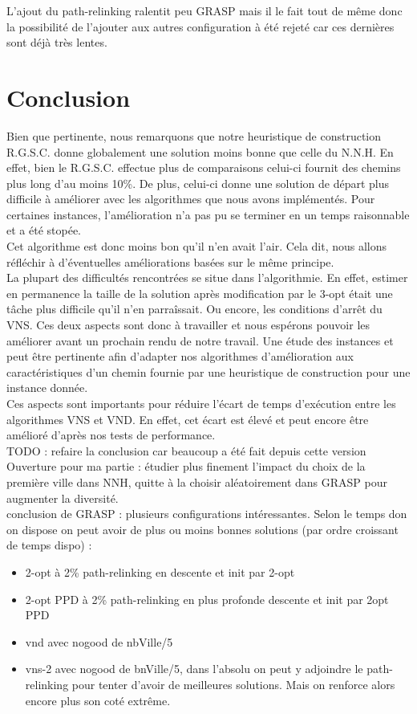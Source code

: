 \documentclass[12pt,a4paper]{article}
\begin{document}
L'ajout du path-relinking ralentit peu GRASP mais il le fait tout de même donc la possibilité de l'ajouter aux autres configuration à été rejeté car ces dernières sont déjà très lentes.\\

\section*{Conclusion}
Bien que pertinente, nous remarquons que notre heuristique de construction R.G.S.C. donne globalement une solution moins bonne que celle du N.N.H. En effet, bien le R.G.S.C. effectue plus de comparaisons celui-ci fournit des chemins plus long d'au moins 10\%. De plus, celui-ci donne une solution de départ plus difficile à améliorer avec les algorithmes que nous avons implémentés. Pour certaines instances, l'amélioration n'a pas pu se terminer en un temps raisonnable et a été stopée.\\
Cet algorithme est donc moins bon qu'il n'en avait l'air. Cela dit, nous allons réfléchir à d'éventuelles améliorations basées sur le même principe.\\
La plupart des difficultés rencontrées se situe dans l'algorithmie. En effet, estimer en permanence la taille de la solution après modification par le 3-opt était une tâche plus difficile qu'il n'en parraîssait. Ou encore, les conditions d'arrêt du VNS. Ces deux aspects sont donc à travailler et nous espérons pouvoir les améliorer avant un prochain rendu de notre travail. Une étude des instances et peut être pertinente afin d'adapter nos algorithmes d'amélioration aux caractéristiques d'un chemin fournie par une heuristique de construction pour une instance donnée.\\
Ces aspects sont importants pour réduire l'écart de temps d’exécution entre les algorithmes VNS et VND. En effet, cet écart est élevé et peut encore être amélioré d'après nos tests de performance.\\

TODO : refaire la conclusion car beaucoup a été fait depuis cette version\\

Ouverture pour ma partie : étudier plus finement l'impact du choix de la première ville dans NNH, quitte à la choisir aléatoirement dans GRASP pour augmenter la diversité.\\

conclusion de GRASP : plusieurs configurations intéressantes. Selon le temps don on dispose on peut avoir de plus ou moins bonnes solutions (par ordre croissant de temps dispo) :
\begin{itemize}
\item 2-opt à 2\% path-relinking en descente et init par 2-opt
\item 2-opt PPD à 2\% path-relinking en plus profonde descente et init par 2opt PPD
\item vnd avec nogood de nbVille/5
\item vns-2 avec nogood de bnVille/5, dans l'absolu on peut y adjoindre le path-relinking pour tenter d'avoir de meilleures solutions. Mais on renforce alors encore plus son coté extrême.
\end{itemize}
\end{document}
